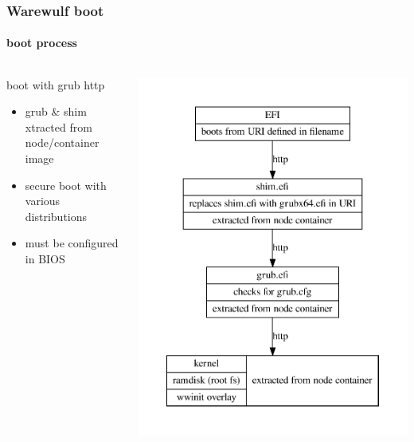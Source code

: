 \documentclass[aspectratio=169]{beamer}
\begin{document}
\begin{frame}[fragile]
\frametitle{Warewulf boot}
\framesubtitle{boot process}
\begin{columns}
\begin{block}{boot with grub http}
\begin{itemize}
  \item grub \& shim xtracted from node/container image
  \item secure boot with various distributions
  \item must be configured in BIOS
\end{itemize}
\end{block}
\includegraphics[width=.8\linewidth]{grub_http}
\end{columns}
\end{frame}
\end{document}
